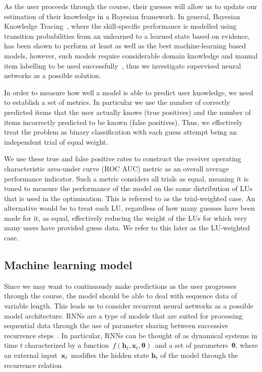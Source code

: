 As the user proceeds through the course, their guesses will allow us to update our estimation of their knowledge in a Bayesian framework. In general, Bayesian Knowledge Tracing~\cite{corbett1994knowledge}, where the skill-specific performance is modelled using transition probabilities from an unlearned to a learned state based on evidence, has been shown to perform at least as well as the best machine-learning based models, however, such models require considerable domain knowledge and manual item labelling to be used successfully~\cite{khajah2016deep}, thus we investigate supervised neural networks as a possible solution.

In order to measure how well a model is able to predict user knowledge, we need to establish a set of metrics. In particular we use the number of correctly predicted items that the user actually knows (true positives) and the number of items incorrectly predicted to be known (false positives). Thus, we effectively treat the problem as binary classification with each guess attempt being an independent trial of equal weight.

We use these true and false positive rates to construct the receiver operating characteristic area-under curve (ROC AUC) metric as an overall average performance indicator. Such a metric considers all trials as equal, meaning it is tuned to measure the performance of the model on the same distribution of LUs that is used in the optimisation. This is referred to as the trial-weighted case. An alternative would be to treat each LU, regardless of how many guesses have been made for it, as equal, effectively reducing the weight of the LUs for which very many users have provided guess data. We refer to this later as the LU-weighted case.

\subsection{Machine learning model}
\label{sec:nlp_model}
Since we may want to continuously make predictions as the user progresses through the course, the model should be able to deal with sequence data of variable length. This leads us to consider recurrent neural networks as a possible model architecture. RNNs are a type of models that are suited for processing sequential data through the use of parameter sharing between successive recurrence steps~\cite{rumelhart1986}. In particular, RNNs can be thought of as dynamical systems in time $t$ characterized by a function~$f(\mathbf{h}_t, \mathbf{x}_t, \mathbf{\theta})$~and a set of parameters~$\mathbf{\theta}$, where an external input~$\mathbf{x}_t$~modifies the hidden state $\mathbf{h}_t$ of the model through the recurrence relation

